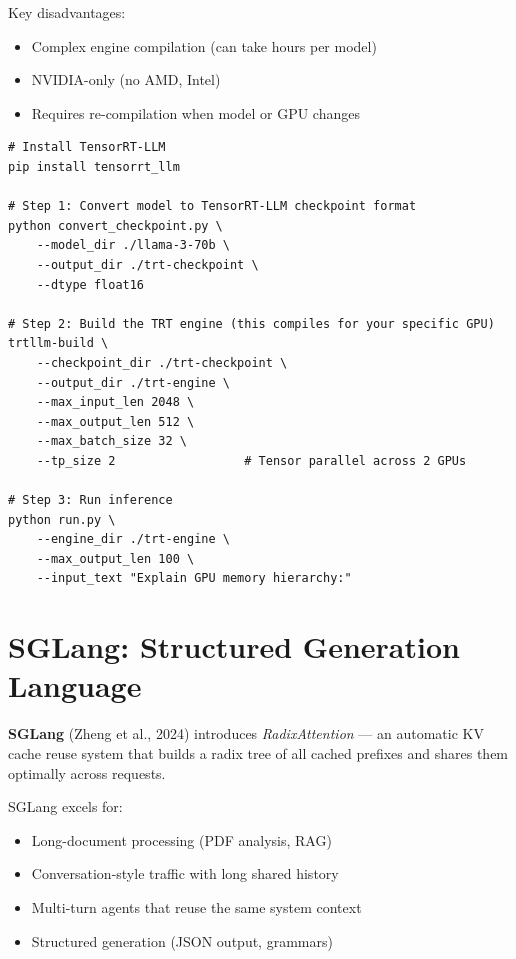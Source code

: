 \documentclass[10pt, oneside, openany]{book}
\newcommand{\keyterm}[1]{\textbf{\color{AccentOrange}#1}}
\begin{document}
Key disadvantages:
\begin{itemize}
  \item Complex engine compilation (can take hours per model)
  \item NVIDIA-only (no AMD, Intel)
  \item Requires re-compilation when model or GPU changes
\end{itemize}

\begin{lstlisting}[style=bashstyle, caption={Building and running a TensorRT-LLM engine}]
# Install TensorRT-LLM
pip install tensorrt_llm

# Step 1: Convert model to TensorRT-LLM checkpoint format
python convert_checkpoint.py \
    --model_dir ./llama-3-70b \
    --output_dir ./trt-checkpoint \
    --dtype float16

# Step 2: Build the TRT engine (this compiles for your specific GPU)
trtllm-build \
    --checkpoint_dir ./trt-checkpoint \
    --output_dir ./trt-engine \
    --max_input_len 2048 \
    --max_output_len 512 \
    --max_batch_size 32 \
    --tp_size 2                  # Tensor parallel across 2 GPUs

# Step 3: Run inference
python run.py \
    --engine_dir ./trt-engine \
    --max_output_len 100 \
    --input_text "Explain GPU memory hierarchy:"
\end{lstlisting}

\section{SGLang: Structured Generation Language}
\index{SGLang}

\keyterm{SGLang} (Zheng et al., 2024) introduces \textit{RadixAttention} --- an
automatic KV cache reuse system that builds a radix tree of all cached prefixes
and shares them optimally across requests.

SGLang excels for:
\begin{itemize}
  \item Long-document processing (PDF analysis, RAG)
  \item Conversation-style traffic with long shared history
  \item Multi-turn agents that reuse the same system context
  \item Structured generation (JSON output, grammars)
\end{itemize}
\end{document}
